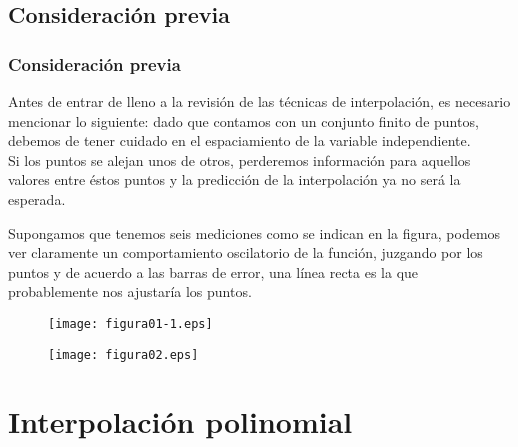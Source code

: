 \subsection{Consideración previa}
\begin{frame}
\frametitle{Consideración previa}
Antes de entrar de lleno a la revisión de las técnicas de interpolación, es necesario mencionar lo siguiente: dado que contamos con un conjunto finito de puntos, debemos de tener cuidado en el espaciamiento de la variable independiente.
\\
\bigskip
Si los puntos se alejan unos de otros, perderemos información para aquellos valores entre éstos puntos y la predicción de la interpolación ya no será la esperada.
\end{frame}
\begin{frame}
Supongamos que tenemos seis mediciones como se indican en la figura, podemos ver claramente un comportamiento oscilatorio de la función, juzgando por los puntos y de acuerdo a las barras de error, una línea recta es la que probablemente nos ajustaría los puntos.
\begin{figure}
	\centering
	\texttt{[image: figura01-1.eps]} 
\end{figure}
\end{frame}
\begin{frame}
\begin{figure}
	\centering
		\texttt{[image: figura02.eps]} 
\end{figure}
\end{frame}
\section{Interpolación polinomial}
